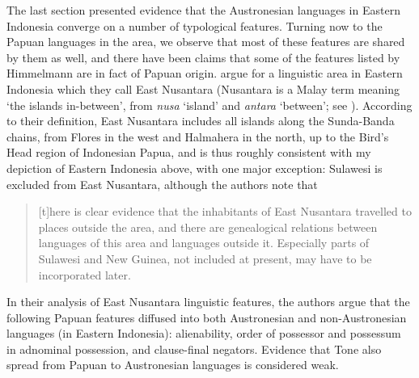 The last section presented evidence that the Austronesian languages in Eastern Indonesia converge on a number of typological features. Turning now to the Papuan languages in the area, we observe that most of these features are shared by them as well, and there have been claims that some of the features listed by Himmelmann are in fact of Papuan origin. \citet{klamer2008east} argue for a linguistic area in Eastern Indonesia which they call East Nusantara (Nusantara is a Malay term meaning `the islands in-between', from \textit{nusa} `island' and \textit{antara} `between'; see \citealt[99]{klamer2008east}). According to their definition, East Nusantara includes all islands along the Sunda-Banda chains, from Flores in the west and Halmahera in the north, up to the Bird's Head region of Indonesian Papua, and is thus roughly consistent with my depiction of Eastern Indonesia above, with one major exception: Sulawesi is excluded from East Nusantara, although the authors note that 

\begin{quote}[t]here is clear evidence that the inhabitants of East Nusantara travelled to places outside the area, and there are genealogical relations between languages of this area and languages outside it. Especially parts of Sulawesi and New Guinea, not included at present, may have to be incorporated later.\end{quote}

In their analysis of East Nusantara linguistic features, the authors argue that the following Papuan features diffused into both Austronesian and non-Austronesian languages (in Eastern Indonesia): alienability, order of possessor and possessum in adnominal possession, and clause-final negators. Evidence that Tone also spread from Papuan to Austronesian languages is considered weak.

